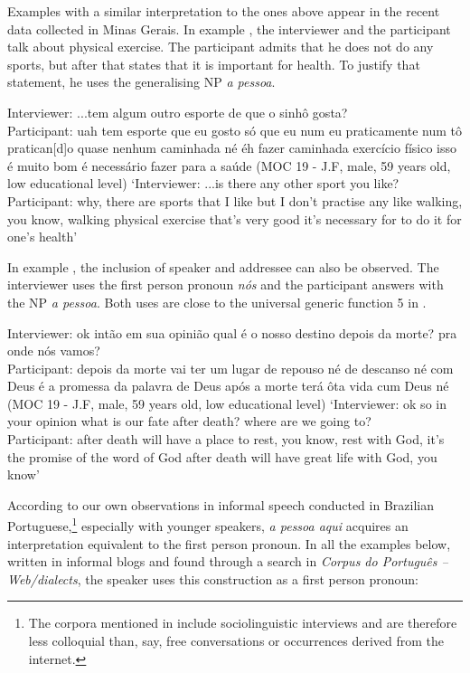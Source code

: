 \documentclass[output=paper]{langscibook}
\begin{document}
{Examples with a similar interpretation to the ones above appear in the recent data collected in Minas Gerais. In example , the interviewer and the participant talk about physical exercise. The participant admits that he does not do any sports, but after that states that it is important for health. To justify that statement, he uses the generalising NP} {\textit{a pessoa}}. 



\eanoraggedright\label{ex:amaral:32}
{Interviewer:} {{...tem algum outro esporte de que o sinhô gosta?}}\\
{Participant:} {{uah tem esporte que eu gosto só que eu num eu praticamente num tô pratican[d]o quase nenhum caminhada né éh fazer caminhada exercício físico isso é muito bom é necessário}}  fazer para a saúde {(MOC 19 - J.F, male, 59 years old, low educational level)}
\glt 
`{Interviewer:} {...is there any other sport you like?}
{Participant:} why, there are sports that I like but I don’t practise any like walking, you know, walking physical exercise that’s very good it’s necessary for {} {to do it for one’s health’}
\z 


In example , the inclusion of speaker and addressee can also be observed. The interviewer uses the first person pronoun {\textit{nós}} {and the participant answers with the NP} \textit{a pessoa}. Both uses are close to the universal generic function 5 in .



\eanoraggedright\label{ex:amaral:33}
{Interviewer:} {ok intão em sua opinião qual é o nosso destino depois da morte? pra onde nós vamos?}\\
{Participant:} depois da morte  vai ter um lugar de repouso né de descanso né com Deus é a promessa da palavra de Deus após a morte  terá ôta vida cum Deus né (MOC 19 - J.F, male, 59 years old, low educational level)
\glt `{Interviewer:} ok so in your opinion what is our fate after death? where are we going to?\\
      Participant: {after death}  will have a place to rest, you know, rest with God, it’s the promise of the word of God after death  will have great life with God, you know’
\z 


{According to our own observations in informal speech conducted in Brazilian Portuguese,}\footnote{{The corpora mentioned in  include sociolinguistic interviews and are therefore less colloquial than, say, free conversations or occurrences derived from the internet.}} {especially with younger speakers,} {\textit{a pessoa aqui}} {acquires an interpretation equivalent to the first person pronoun}{. }{In all the examples below, written in informal blogs and found through a search in} {\textit{Corpus do Português – Web/dialects}}{, the speaker uses this construction as a first person pronoun:} 
\end{document}
